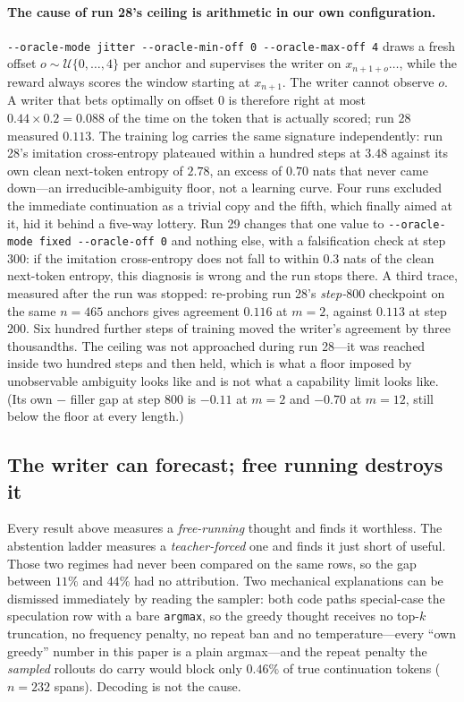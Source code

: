 \documentclass{article} %
\begin{document}
\paragraph{The cause of run 28's ceiling is arithmetic in our own configuration.} \verb|--oracle-mode jitter --oracle-min-off 0 --oracle-max-off 4| draws a fresh offset $o \sim \mathcal{U}\{0,\dots,4\}$ per anchor and supervises the writer on $x_{n+1+o}\dots$, while the reward always scores the window starting at $x_{n+1}$. The writer cannot observe $o$. A writer that bets optimally on offset $0$ is therefore right at most $0.44 \times 0.2 = 0.088$ of the time on the token that is actually scored; run 28 measured $0.113$. The training log carries the same signature independently: run 28's imitation cross-entropy plateaued within a hundred steps at $3.48$ against its own clean next-token entropy of $2.78$, an excess of $0.70$ nats that never came down---an irreducible-ambiguity floor, not a learning curve. Four runs excluded the immediate continuation as a trivial copy and the fifth, which finally aimed at it, hid it behind a five-way lottery. Run 29 changes that one value to \verb|--oracle-mode fixed --oracle-off 0| and nothing else, with a falsification check at step $300$: if the imitation cross-entropy does not fall to within $0.3$ nats of the clean next-token entropy, this diagnosis is wrong and the run stops there. A third trace, measured after the run was stopped: re-probing run 28's \emph{step-$800$} checkpoint on the same $n=465$ anchors gives agreement $0.116$ at $m{=}2$, against $0.113$ at step $200$. Six hundred further steps of training moved the writer's agreement by three thousandths. The ceiling was not approached during run 28---it was reached inside two hundred steps and then held, which is what a floor imposed by unobservable ambiguity looks like and is not what a capability limit looks like. (Its own $-$ filler gap at step $800$ is $-0.11$ at $m{=}2$ and $-0.70$ at $m{=}12$, still below the floor at every length.)

\subsection{The writer can forecast; free running destroys it}
\label{sec:tfslot}

Every result above measures a \emph{free-running} thought and finds it worthless. The abstention
ladder measures a \emph{teacher-forced} one and finds it just short of useful. Those two regimes had
never been compared on the same rows, so the gap between $11\%$ and $44\%$ had no attribution. Two
mechanical explanations can be dismissed immediately by reading the sampler: both code paths
special-case the speculation row with a bare \texttt{argmax}, so the greedy thought receives no
top-$k$ truncation, no frequency penalty, no repeat ban and no temperature---every ``own greedy''
number in this paper is a plain argmax---and the repeat penalty the \emph{sampled} rollouts do carry
would block only $0.46\%$ of true continuation tokens ($n=232$ spans). Decoding is not the cause.
\end{document}
